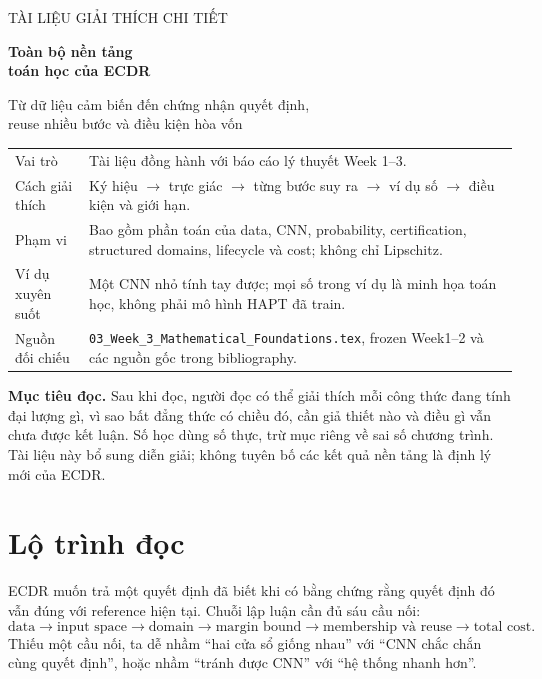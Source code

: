 \documentclass[11pt,a4paper]{article}
\newcommand{\code}[1]{{\small\ttfamily\nolinkurl{#1}}}
\theoremstyle{definition}
\begin{document}
\hypersetup{pageanchor=false}
\begin{titlepage}
\vspace*{1.1cm}
{\Large\color{teal} TÀI LIỆU GIẢI THÍCH CHI TIẾT\par}
\vspace{0.6cm}
{\huge\bfseries\color{ink} Toàn bộ nền tảng\\toán học của ECDR\par}
\vspace{0.7cm}
{\Large Từ dữ liệu cảm biến đến chứng nhận quyết định,\\
reuse nhiều bước và điều kiện hòa vốn\par}
\vspace{1cm}
\begin{tabularx}{\linewidth}{@{}p{3cm}Y@{}}\toprule
Vai trò & Tài liệu đồng hành với báo cáo lý thuyết Week 1--3.\\
Cách giải thích & Ký hiệu $\to$ trực giác $\to$ từng bước suy ra $\to$
ví dụ số $\to$ điều kiện và giới hạn.\\
Phạm vi & Bao gồm phần toán của data, CNN, probability, certification,
structured domains, lifecycle và cost; không chỉ Lipschitz.\\
Ví dụ xuyên suốt & Một CNN nhỏ tính tay được; mọi số trong ví dụ là minh
họa toán học, không phải mô hình HAPT đã train.\\
Nguồn đối chiếu & \code{03_Week_3_Mathematical_Foundations.tex}, frozen Week1--2 và các nguồn gốc trong bibliography.\\\bottomrule
\end{tabularx}
\vfill
\textbf{Mục tiêu đọc.} Sau khi đọc, người đọc có thể giải thích mỗi công
thức đang tính đại lượng gì, vì sao bất đẳng thức có chiều đó, cần giả thiết
nào và điều gì vẫn chưa được kết luận. Số học dùng số thực, trừ mục riêng
về sai số chương trình. Tài liệu này bổ sung diễn giải; không tuyên bố các
kết quả nền tảng là định lý mới của ECDR.
\end{titlepage}
\hypersetup{pageanchor=true}

\section*{Lộ trình đọc}
ECDR muốn trả một quyết định đã biết khi có bằng chứng rằng quyết định đó
vẫn đúng với reference hiện tại. Chuỗi lập luận cần đủ sáu cầu nối:
\begin{equation*}
\text{data}\to\text{input space}\to\text{domain}\to\text{margin bound}
\to\text{membership và reuse}\to\text{total cost}.
\end{equation*}
Thiếu một cầu nối, ta dễ nhầm ``hai cửa sổ giống nhau'' với ``CNN chắc chắn
cùng quyết định'', hoặc nhầm ``tránh được CNN'' với ``hệ thống nhanh hơn''.
\end{document}
